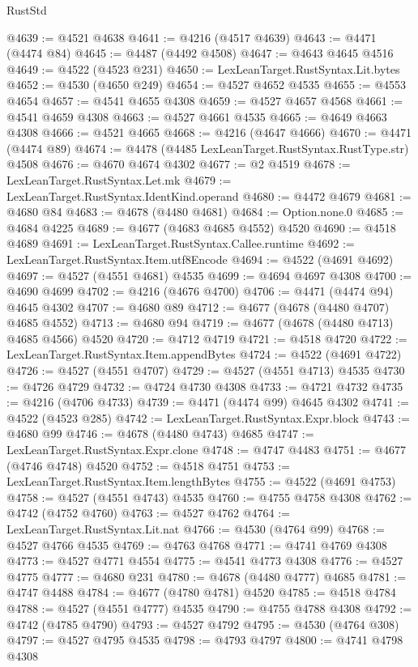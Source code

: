 \begin{lexlean}{RustStd}
\begin{coremodule}
@4639 := @4521 @4638
@4641 := @4216 (@4517 @4639)
@4643 := @4471 (@4474 @84)
@4645 := @4487 (@4492 @4508)
@4647 := @4643 @4645 @4516
@4649 := @4522 (@4523 @231)
@4650 := LexLeanTarget.RustSyntax.Lit.bytes
@4652 := @4530 (@4650 @249)
@4654 := @4527 @4652 @4535
@4655 := @4553 @4654
@4657 := @4541 @4655 @4308
@4659 := @4527 @4657 @4568
@4661 := @4541 @4659 @4308
@4663 := @4527 @4661 @4535
@4665 := @4649 @4663 @4308
@4666 := @4521 @4665
@4668 := @4216 (@4647 @4666)
@4670 := @4471 (@4474 @89)
@4674 := @4478 (@4485 LexLeanTarget.RustSyntax.RustType.str) @4508
@4676 := @4670 @4674 @4302
@4677 := @2 @4519
@4678 := LexLeanTarget.RustSyntax.Let.mk
@4679 := LexLeanTarget.RustSyntax.IdentKind.operand
@4680 := @4472 @4679
@4681 := @4680 @84
@4683 := @4678 (@4480 @4681)
@4684 := Option.none.{0}
@4685 := @4684 @4225
@4689 := @4677 (@4683 @4685 @4552) @4520
@4690 := @4518 @4689
@4691 := LexLeanTarget.RustSyntax.Callee.runtime
@4692 := LexLeanTarget.RustSyntax.Item.utf8Encode
@4694 := @4522 (@4691 @4692)
@4697 := @4527 (@4551 @4681) @4535
@4699 := @4694 @4697 @4308
@4700 := @4690 @4699
@4702 := @4216 (@4676 @4700)
@4706 := @4471 (@4474 @94) @4645 @4302
@4707 := @4680 @89
@4712 := @4677 (@4678 (@4480 @4707) @4685 @4552)
@4713 := @4680 @94
@4719 := @4677 (@4678 (@4480 @4713) @4685 @4566) @4520
@4720 := @4712 @4719
@4721 := @4518 @4720
@4722 := LexLeanTarget.RustSyntax.Item.appendBytes
@4724 := @4522 (@4691 @4722)
@4726 := @4527 (@4551 @4707)
@4729 := @4527 (@4551 @4713) @4535
@4730 := @4726 @4729
@4732 := @4724 @4730 @4308
@4733 := @4721 @4732
@4735 := @4216 (@4706 @4733)
@4739 := @4471 (@4474 @99) @4645 @4302
@4741 := @4522 (@4523 @285)
@4742 := LexLeanTarget.RustSyntax.Expr.block
@4743 := @4680 @99
@4746 := @4678 (@4480 @4743) @4685
@4747 := LexLeanTarget.RustSyntax.Expr.clone
@4748 := @4747 @4483
@4751 := @4677 (@4746 @4748) @4520
@4752 := @4518 @4751
@4753 := LexLeanTarget.RustSyntax.Item.lengthBytes
@4755 := @4522 (@4691 @4753)
@4758 := @4527 (@4551 @4743) @4535
@4760 := @4755 @4758 @4308
@4762 := @4742 (@4752 @4760)
@4763 := @4527 @4762
@4764 := LexLeanTarget.RustSyntax.Lit.nat
@4766 := @4530 (@4764 @99)
@4768 := @4527 @4766 @4535
@4769 := @4763 @4768
@4771 := @4741 @4769 @4308
@4773 := @4527 @4771 @4554
@4775 := @4541 @4773 @4308
@4776 := @4527 @4775
@4777 := @4680 @231
@4780 := @4678 (@4480 @4777) @4685
@4781 := @4747 @4488
@4784 := @4677 (@4780 @4781) @4520
@4785 := @4518 @4784
@4788 := @4527 (@4551 @4777) @4535
@4790 := @4755 @4788 @4308
@4792 := @4742 (@4785 @4790)
@4793 := @4527 @4792
@4795 := @4530 (@4764 @308)
@4797 := @4527 @4795 @4535
@4798 := @4793 @4797
@4800 := @4741 @4798 @4308

\end{coremodule}
\end{lexlean}
